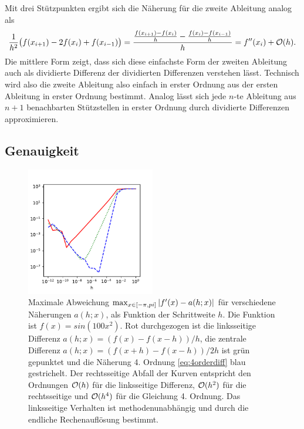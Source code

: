 Mit drei Stützpunkten ergibt sich die Näherung für die zweite
Ableitung analog als
\begin{multline}
  \label{eq:1order2diff}
  \frac{1}{h^2}\bigl(f(x_{i+1}) -
  2f(x_i)  + f(x_{i-1})\bigr) =
  \frac{\frac{f(x_{i+1}) - f(x_i)}{h}  -
    \frac{f(x_i) - f(x_{i-1})}{h}}{h}
  = f''(x_i) + \mathcal O(h).
\end{multline}
Die mittlere Form zeigt, dass sich diese einfachste Form der zweiten
Ableitung auch als dividierte Differenz der dividierten Differenzen
verstehen lässt. Technisch wird also die zweite Ableitung also einfach
in erster Ordnung aus der ersten Ableitung in erster Ordnung
bestimmt. Analog lässt sich jede $n$-te Ableitung aus $n+1$
benachbarten Stützstellen in erster Ordnung durch dividierte
Differenzen approximieren.

\subsection{Genauigkeit}

\begin{figure}
  \centering
  \includegraphics[width=0.5\textwidth]{plots/num_diff}
  \caption{Maximale Abweichung $\max_{x\in[-\pi,pi]} \left\lvert{f'(x) - a(h;
      x)}\right\rvert$ für verschiedene Näherungen $a(h; x)$, als Funktion der
    Schrittweite $h$. Die Funktion ist $f(x)=sin(100x^2)$. Rot
    durchgezogen ist die linksseitige Differenz $a(h; x) = (f(x) -
    f(x-h))/h$, die zentrale Differenz $a(h; x) = (f(x+h) -
    f(x-h))/2h$ ist grün gepunktet und die Näherung 4. Ordnung
    \eqref{eq:4orderdiff} blau gestrichelt. Der rechtsseitige Abfall
    der Kurven entspricht den Ordnungen $\mathcal O(h)$ für die linksseitige
    Differenz, $\mathcal O(h^2)$ für die rechtsseitige und $\mathcal O(h^4)$ für die
    Gleichung 4. Ordnung. Das linksseitige Verhalten ist
    methodenunabhängig und durch die endliche Rechenauflösung bestimmt.}
  \label{fig:num_diff}
\end{figure}

